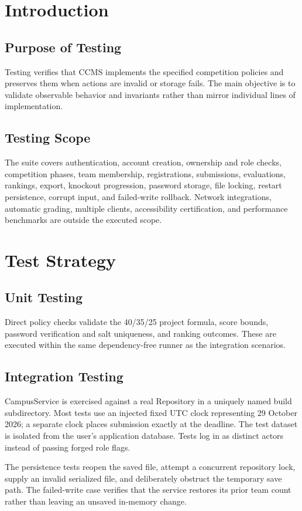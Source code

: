 \section{Introduction}
\subsection{Purpose of Testing}
Testing verifies that CCMS implements the specified competition policies and preserves them when actions are invalid or storage fails. The main objective is to validate observable behavior and invariants rather than mirror individual lines of implementation.
\subsection{Testing Scope}
The suite covers authentication, account creation, ownership and role checks, competition phases, team membership, registrations, submissions, evaluations, rankings, export, knockout progression, password storage, file locking, restart persistence, corrupt input, and failed-write rollback. Network integrations, automatic grading, multiple clients, accessibility certification, and performance benchmarks are outside the executed scope.

\section{Test Strategy}
\subsection{Unit Testing}
Direct policy checks validate the 40/35/25 project formula, score bounds, password verification and salt uniqueness, and ranking outcomes. These are executed within the same dependency-free runner as the integration scenarios.
\subsection{Integration Testing}
CampusService is exercised against a real Repository in a uniquely named build subdirectory. Most tests use an injected fixed UTC clock representing 29 October 2026; a separate clock places submission exactly at the deadline. The test dataset is isolated from the user's application database. Tests log in as distinct actors instead of passing forged role flags.

The persistence tests reopen the saved file, attempt a concurrent repository lock, supply an invalid serialized file, and deliberately obstruct the temporary save path. The failed-write case verifies that the service restores its prior team count rather than leaving an unsaved in-memory change.
